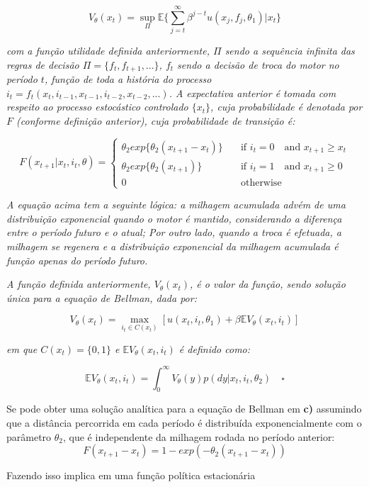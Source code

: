 \documentclass[12pt,a4paper]{article}
\begin{document}
\[
V_\theta(x_t)=\sup_\Pi \mathbb{E}\Bigg\{\sum_{j=t}^\infty \beta^{j-t}u(x_j,f_j,\theta_1)|x_t\Bigg\} 
\]

\emph{com a função utilidade definida anteriormente, \(\Pi\) sendo a
sequência infinita das regras de decisão \(\Pi=\{f_t,f_{t+1},...\}\),
\(f_t\) sendo a decisão de troca do motor no período \(t\), função de
toda a história do processo
\(i_t=f_t(x_t,i_{t-1},x_{t-1},i_{t-2},x_{t-2},...)\). A expectativa
anterior é tomada com respeito ao processo estocástico controlado
\(\{x_t\}\), cuja probabilidade é denotada por \(F\) (conforme definição
anterior), cuja probabilidade de transição é:}

\[
F(x_{t+1}| x_t, i_t, \theta) = 
  \begin{cases}
    \theta_2exp\{\theta_2(x_{t+1}-x_t)\}    & \quad \text{if } i_t=0  \quad \text{and } x_{t+1} \geq x_t \\
    \theta_2exp\{\theta_2(x_{t+1})\}    & \quad \text{if } i_t=1  \quad \text{and } x_{t+1} \geq 0 \\
     0 &  \quad \text{otherwise}
  \end{cases}
\]

\emph{A equação acima tem a seguinte lógica: a milhagem acumulada advém
de uma distribuição exponencial quando o motor é mantido, considerando a
diferença entre o período futuro e o atual; Por outro lado, quando a
troca é efetuada, a milhagem se regenera e a distribuição exponencial da
milhagem acumulada é função apenas do período futuro.}

\emph{A função definida anteriormente, \(V_\theta(x_t)\), é o valor da
função, sendo solução única para a equação de Bellman, dada por:}

\[
V_\theta(x_t) = \max_{i_t \in C(x_t)}[u(x_t,i_t,\theta_1)+\beta\mathbb{E}V_\theta(x_t,i_t)]
\]

\emph{em que \(C(x_t)=\{0,1\}\) e \(\mathbb{E}V_\theta(x_t,i_t)\) é
definido como:}

\[
\mathbb{E}V_\theta(x_t,i_t)=\int_0^\infty V_\theta(y)p(dy|x_t,i_t,\theta_2) \quad \square
\]

Se pode obter uma solução analítica para a equação de Bellman em
\textbf{c)} assumindo que a distância percorrida em cada período é
distribuída exponencialmente com o parâmetro \(\theta_2\), que é
independente da milhagem rodada no período anterior: \[
F(x_{t+1} - x_t) = 1 - exp(-\theta_2(x_{t+1} - x_t))
\]

Fazendo isso implica em uma função política estacionária
\end{document}
